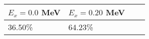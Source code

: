 \begin{tabular}{llll} \hline
\toprule 
$E_{x}=0.0$ MeV & $E_{x}=0.20$ MeV \\ 
 \midrule 
 36.50\% & 64.23\% &\\ 
\bottomrule 
\end{tabular}
